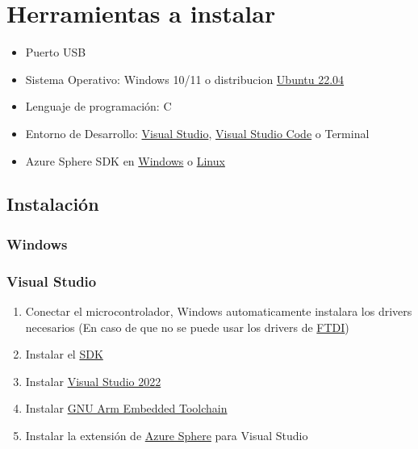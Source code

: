 \section{Herramientas a instalar}

\begin{itemize}
	\item 
	Puerto USB
	\item
	Sistema Operativo: Windows 10/11 o 
	distribucion \href{https://releases.ubuntu.com/jammy/}{Ubuntu 22.04} 
	\item 
	Lenguaje de programación: C
	\item 
	Entorno de Desarrollo: \href{https://visualstudio.microsoft.com/es/}{Visual Studio}, 
	\href{https://code.visualstudio.com/}{Visual Studio Code} o Terminal
	\item
	Azure Sphere SDK en \href{https://learn.microsoft.com/en-us/azure-sphere/install/install-sdk}{Windows} o \href{https://learn.microsoft.com/en-us/azure-sphere/install/install-sdk-linux}{Linux}
\end{itemize}

\subsection{Instalación}
\subsubsection{Windows}
\subsubsection*{Visual Studio}
\begin{enumerate}
	\item 
	Conectar el microcontrolador, Windows automaticamente instalara los drivers necesarios (En caso de que no se puede usar los drivers de \href{https://www.ftdichip.com/Drivers/VCP.htm}{FTDI})
	\item 
	Instalar el \href{https://aka.ms/AzureSphereSDKDownload/Windows}{SDK}
	\item 
	Instalar \href{https://visualstudio.microsoft.com/downloads/}{Visual Studio 2022}
	\item
	Instalar \href{https://developer.arm.com/downloads/-/gnu-rm}{GNU Arm Embedded Toolchain}
	\item
	Instalar la extensión de \href{https://marketplace.visualstudio.com/items?itemName=AzureSphereTeam.AzureSphereSDKforVisualStudio2022}{Azure Sphere} para Visual Studio
\end{enumerate}
